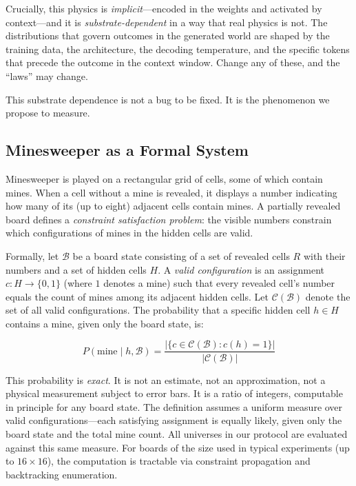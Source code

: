 \documentclass[12pt,a4paper]{article}
\begin{document}
Crucially, this physics is \emph{implicit}---encoded in the weights and activated by context---and it is \emph{substrate-dependent} in a way that real physics is not. The distributions that govern outcomes in the generated world are shaped by the training data, the architecture, the decoding temperature, and the specific tokens that precede the outcome in the context window. Change any of these, and the ``laws'' may change.

This substrate dependence is not a bug to be fixed. It is the phenomenon we propose to measure.

\subsection{Minesweeper as a Formal System}
\label{sec:minesweeper_formal}

Minesweeper is played on a rectangular grid of cells, some of which contain mines. When a cell without a mine is revealed, it displays a number indicating how many of its (up to eight) adjacent cells contain mines. A partially revealed board defines a \emph{constraint satisfaction problem}: the visible numbers constrain which configurations of mines in the hidden cells are valid.

Formally, let $\mathcal{B}$ be a board state consisting of a set of revealed cells $R$ with their numbers and a set of hidden cells $H$. A \emph{valid configuration} is an assignment $c: H \to \{0, 1\}$ (where $1$ denotes a mine) such that every revealed cell's number equals the count of mines among its adjacent hidden cells. Let $\mathcal{C}(\mathcal{B})$ denote the set of all valid configurations. The probability that a specific hidden cell $h \in H$ contains a mine, given only the board state, is:

\begin{equation}
P(\text{mine} \mid h, \mathcal{B}) = \frac{|\{c \in \mathcal{C}(\mathcal{B}) : c(h) = 1\}|}{|\mathcal{C}(\mathcal{B})|}
\label{eq:mine_prob}
\end{equation}

This probability is \emph{exact}. It is not an estimate, not an approximation, not a physical measurement subject to error bars. It is a ratio of integers, computable in principle for any board state. The definition assumes a uniform measure over valid configurations---each satisfying assignment is equally likely, given only the board state and the total mine count. All universes in our protocol are evaluated against this same measure. For boards of the size used in typical experiments (up to $16 \times 16$), the computation is tractable via constraint propagation and backtracking enumeration.
\end{document}

